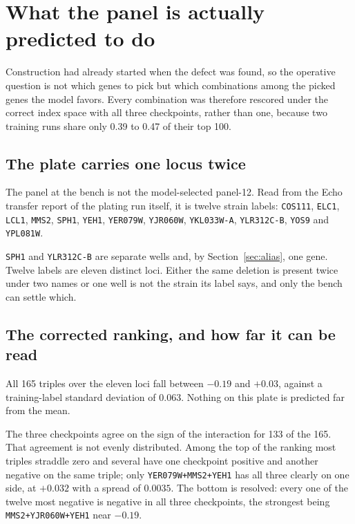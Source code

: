 
\section{What the panel is actually predicted to do}
\label{sec:panel}

Construction had already started when the defect was found, so the operative
question is not which genes to pick but which combinations among the picked genes
the model favors. Every combination was therefore rescored under the correct
index space with all three checkpoints, rather than one, because two training
runs share only 0.39 to 0.47 of their top 100.

\subsection{The plate carries one locus twice}

The panel at the bench is not the model-selected panel-12. Read from the Echo
transfer report of the plating run itself, it is twelve strain labels:
\texttt{COS111}, \texttt{ELC1}, \texttt{LCL1}, \texttt{MMS2}, \texttt{SPH1},
\texttt{YEH1}, \texttt{YER079W}, \texttt{YJR060W}, \texttt{YKL033W-A},
\texttt{YLR312C-B}, \texttt{YOS9} and \texttt{YPL081W}.

\texttt{SPH1} and \texttt{YLR312C-B} are separate wells and, by
Section~\ref{sec:alias}, one gene. Twelve labels are eleven distinct loci. Either
the same deletion is present twice under two names or one well is not the strain
its label says, and only the bench can settle which.

\subsection{The corrected ranking, and how far it can be read}

All 165 triples over the eleven loci fall between $-0.19$ and $+0.03$, against a
training-label standard deviation of $0.063$. Nothing on this plate is predicted
far from the mean.

The three checkpoints agree on the sign of the interaction for 133 of the 165.
That agreement is not evenly distributed. Among the top of the ranking most
triples straddle zero and several have one checkpoint positive and another
negative on the same triple; only \texttt{YER079W+MMS2+YEH1} has all three
clearly on one side, at $+0.032$ with a spread of $0.0035$. The bottom is
resolved: every one of the twelve most negative is negative in all three
checkpoints, the strongest being \texttt{MMS2+YJR060W+YEH1} near $-0.19$.

